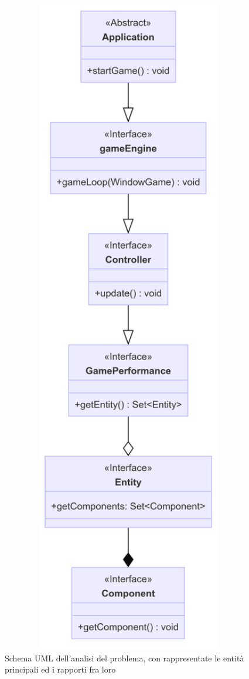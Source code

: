 \begin{figure}[H]
\includegraphics[width=1\textwidth]{img/analisi.png} 
\centering{}
\caption{Schema UML dell'analisi del problema, con rappresentate le entità principali ed i rapporti fra loro}
\label{img:analisi}
\end{figure}

